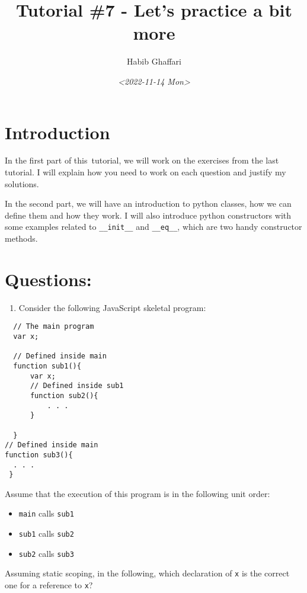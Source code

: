 \documentclass[11pt]{article}
\author{Habib Ghaffari}
\date{\textit{<2022-11-14 Mon>}}
\title{Tutorial \#7 - Let's practice a bit more}
\begin{document}
\maketitle
\tableofcontents


\section{Introduction}
\label{sec:orgf50376d}

In the first part of this tutorial, we will work on the exercises from the last
tutorial. I will explain how you need to work on each question and justify my
solutions.

In the second part, we will have an introduction to python classes, how we can
define them and how they work. I will also introduce python constructors with
some examples related to \texttt{\_\_init\_\_} and \texttt{\_\_eq\_\_}, which are two handy constructor
methods.

\section{Questions:}
\label{sec:org287981d}

\begin{enumerate}
\item Consider the following JavaScript skeletal program:
\end{enumerate}

\begin{verbatim}
  // The main program
  var x;

  // Defined inside main
  function sub1(){
      var x;
      // Defined inside sub1
      function sub2(){
          . . .
      }

  } 
// Defined inside main
function sub3(){
  . . .
 }
\end{verbatim}

Assume that the execution of this program is in the following unit order:

\begin{itemize}
\item \texttt{main} calls \texttt{sub1}
\item \texttt{sub1} calls \texttt{sub2}
\item \texttt{sub2} calls \texttt{sub3}
\end{itemize}

Assuming static scoping, in the following, which declaration of \texttt{x} is the
correct one for a reference to \texttt{x}?
\end{document}
